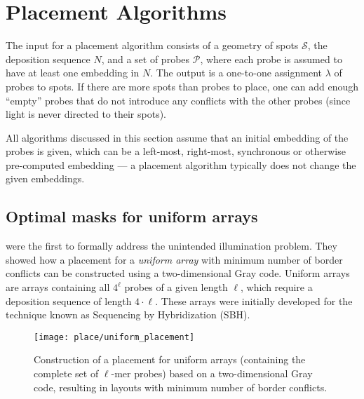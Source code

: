 \chapter{Placement Algorithms}
\label{ch:placement}

The input for a placement algorithm consists of a geometry of spots
$\mathcal{S}$, the deposition sequence $N$, and a set of probes $\mathcal{P}$,
where each probe is assumed to have at least one embedding in $N$. The output is
a one-to-one assignment $\lambda$ of probes to spots. If there are more spots
than probes to place, one can add enough ``empty'' probes that do not introduce
any conflicts with the other probes (since light is never directed to their
spots).

All algorithms discussed in this section assume that an initial embedding of the
probes is given, which can be a left-most, right-most, synchronous or otherwise
pre-computed embedding --- a placement algorithm typically does not change the
given embeddings.

\section{Optimal masks for uniform arrays}
\label{sec:placement_uniform}

\citet{Feldman1994} were the first to formally address the unintended
illumination problem. They showed how a placement for a \emph{uniform array}
with minimum number of border conflicts can be constructed using a
two-dimensional Gray code. Uniform arrays are arrays containing all $4^\ell$
probes of a given length $\ell$, which require a deposition sequence of length
$4\cdot \ell$. These arrays were initially developed for the technique known as
Sequencing by Hybridization (SBH).

\begin{figure}[t]\centering
\texttt{[image: place/uniform\_placement]}
\caption{\label{fig:uniform_placement}%
  Construction of a placement for uniform arrays (containing the complete set of
  $\ell$-mer probes) based on a two-dimensional Gray code, resulting in layouts
  with minimum number of border conflicts.}
\end{figure}

